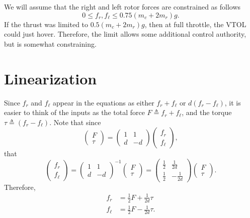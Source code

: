 \documentclass{article}
\begin{document}
We will assume that the right and left rotor forces are constrained as follows
\begin{equation}\label{eq:input_constraints}
	0\leq f_r, f_\ell \leq 0.75 (m_c + 2 m_r)g.
\end{equation}
If the thrust was limited to $0.5 (m_c + 2 m_r)g$, then at full throttle, the VTOL could just hover.  Therefore, the limit allows some additional control authority, but is somewhat constraining.


\section{Linearization}
Since $f_r$ and $f_\ell$ appear in the equations as either $f_r+f_\ell$ or $d(f_r-f_\ell)$, it is easier to think of the inputs as the total force $F\triangleq f_r+f_\ell$, and the torque $\tau\triangleq(f_r-f_\ell)$.  Note that since
\[
\begin{pmatrix} F \\ \tau \end{pmatrix} = \begin{pmatrix} 1 & 1 \\ d & -d \end{pmatrix}\begin{pmatrix} f_r \\ f_\ell \end{pmatrix},
\]
that
\[
\begin{pmatrix} f_r \\ f_\ell \end{pmatrix} = \begin{pmatrix} 1 & 1 \\ d & -d \end{pmatrix}^{-1}\begin{pmatrix} F \\ \tau \end{pmatrix}
= \begin{pmatrix} \frac{1}{2} & \frac{1}{2d} \\ \frac{1}{2} & -\frac{1}{2d} \end{pmatrix} \begin{pmatrix} F \\ \tau \end{pmatrix}.
\]
Therefore, 
\begin{align*}
f_r &= \frac{1}{2} F + \frac{1}{2d}\tau \\
f_\ell &= \frac{1}{2}F - \frac{1}{2d}\tau.
\end{align*}
\end{document}
